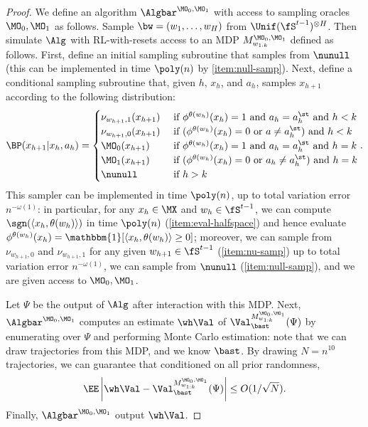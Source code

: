 \begin{proof}
We define an algorithm $\Algbar^{\MO_0,\MO_1}$ with access to sampling oracles $\MO_0,\MO_1$ as follows. Sample $\bw = (w_1,\dots,w_H)$ from $\Unif(\fS^{t-1})^{\otimes H}$. Then simulate $\Alg$ with RL-with-resets access to an MDP $M^{\MO_0,\MO_1}_{w_{1:k}}$ defined as follows. First, define an initial sampling subroutine that samples from $\nunull$ (this can be implemented in time $\poly(n)$ by \cref{item:null-samp}). Next, define a conditional sampling subroutine that, given $h$, $x_h$, and $a_h$, samples $x_{h+1}$ according to the following distribution:
\[\BP(x_{h+1}|x_h,a_h) = \begin{cases} 
\nu_{w_{h+1}, 1}(x_{h+1}) & \text{ if } \phi^{\theta(w_h)}(x_h) = 1 \text{ and } a_h = a^\st_h \text{ and } h < k\\ 
\nu_{w_{h+1}, 0}(x_{h+1}) & \text{ if } (\phi^{\theta(w_h)}(x_h) = 0 \text{ or } a \neq a^\st_h) \text{ and } h < k \\
\MO_0(x_{h+1}) & \text{ if } \phi^{\theta(w_h)}(x_h) = 1 \text{ and } a_h = a^\st_h \text{ and } h = k \\ 
\MO_1(x_{h+1}) &\text{ if } (\phi^{\theta(w_h)}(x_h) = 0 \text{ or } a_h \neq a^\st_h) \text{ and } h = k \\
\nunull & \text{ if } h > k
\end{cases}.
\]
This sampler can be implemented in time $\poly(n)$, up to total variation error $n^{-\omega(1)}$: in particular, for any $x_h \in \MX$ and $w_h \in \fS^{t-1}$, we can compute $\sgn(\langle x_h,\theta(w_h)\rangle)$ in time $\poly(n)$ (\cref{item:eval-halfspace}) and hence evaluate $\phi^{\theta(w_h)}(x_h) = \mathbbm{1}[\langle x_h, \theta(w_h)\rangle \geq 0]$; moreover, we can sample from $\nu_{w_{h+1},0}$ and $\nu_{w_{h+1},1}$ for any given $w_{h+1} \in \fS^{t-1}$ (\cref{item:nu-samp}) up to total variation error $n^{-\omega(1)}$, we can sample from $\nunull$ (\cref{item:null-samp}), and we are given access to $\MO_0,\MO_1$. 

Let $\Psi$ be the output of $\Alg$ after interaction with this MDP. Next, $\Algbar^{\MO_0,\MO_1}$ computes an estimate $\wh \Val$ of $\Val^{M^{\MO_0,\MO_1}_{w_{1:k}}}_{\bast}(\Psi)$ by enumerating over $\Psi$ and performing Monte Carlo estimation: note that we can draw trajectories from this MDP, and we know $\bast$. By drawing $N = n^{10}$ trajectories, we can guarantee that conditioned on all prior randomness,
\[\EE \left|\wh \Val - \Val^{M^{\MO_0,\MO_1}_{w_{1:k}}}_{\bast}(\Psi)\right| \leq O(1/\sqrt{N}).\]
Finally, $\Algbar^{\MO_0,\MO_1}$ output $\wh \Val$.


\end{proof}

